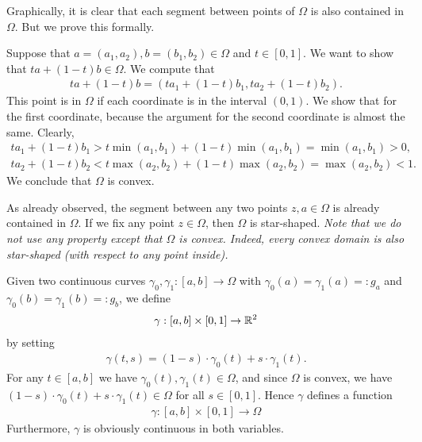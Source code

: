 \documentclass[11pt]{article}
\begin{document}
\begin{solution}
    \item
	Graphically, it is clear that each segment between points of $\Omega$ is also contained in $\Omega$. 
	But we prove this formally. 
	
	Suppose that $a = (a_1,a_2), b = (b_1,b_2) \in \Omega$ and $t \in [0,1]$. We want to show that $ta + (1-t)b \in \Omega$.
	We compute that 
	\begin{align*}
		ta + (1-t)b
		=
		\left( t a_1 + (1-t) b_1, t a_2 + (1-t) b_2 \right).
	\end{align*}
	This point is in $\Omega$ if each coordinate is in the interval $(0,1)$. We show that for the first coordinate,
	because the argument for the second coordinate is almost the same. 
	Clearly,
	\begin{align*}
		t a_1 + (1-t) b_1 > t \min(a_1,b_1) + (1-t) \min(a_1,b_1) = \min(a_1,b_1) > 0,
	\end{align*}
	\begin{align*}
		t a_2 + (1-t) b_2 < t \max(a_2,b_2) + (1-t) \max(a_2,b_2) = \max(a_2, b_2) < 1.
	\end{align*}
	We conclude that $\Omega$ is convex.
	\item 
	As already observed, the segment between any two points $z,a \in \Omega$ is already contained in $\Omega$. 
	If we fix any point $z \in \Omega$, then $\Omega$ is star-shaped. \textit{Note that we do not use any property except that $\Omega$ is convex. Indeed, every convex domain is also star-shaped (with respect to any point inside).}
    \item 
    Given two continuous curves $\gamma_0, \gamma_1 : [a,b] \rightarrow \Omega$ with $\gamma_0(a) = \gamma_1(a) =: g_a$ and $\gamma_0(b) = \gamma_1(b) =: g_b$, we define 
    \begin{align*}
        \gamma : [a,b] \times [0,1] \rightarrow \mathbb{R}^2
    \end{align*}
    by setting 
    \begin{align*}
        \gamma(t,s) = (1-s) \cdot \gamma_0(t) + s \cdot \gamma_1(t).
    \end{align*}
    For any $t \in [a,b]$ we have $\gamma_0(t), \gamma_1(t) \in \Omega$,
    and since $\Omega$ is convex, we have $(1-s) \cdot \gamma_0(t) + s \cdot \gamma_1(t) \in \Omega$ for all $s \in [0,1]$.
    Hence $\gamma$ defines a function 
    \begin{align*}
        \gamma : [a,b] \times [0,1] \rightarrow \Omega
    \end{align*}
    Furthermore, $\gamma$ is obviously continuous in both variables. 
    

\end{solution}
\end{document}
